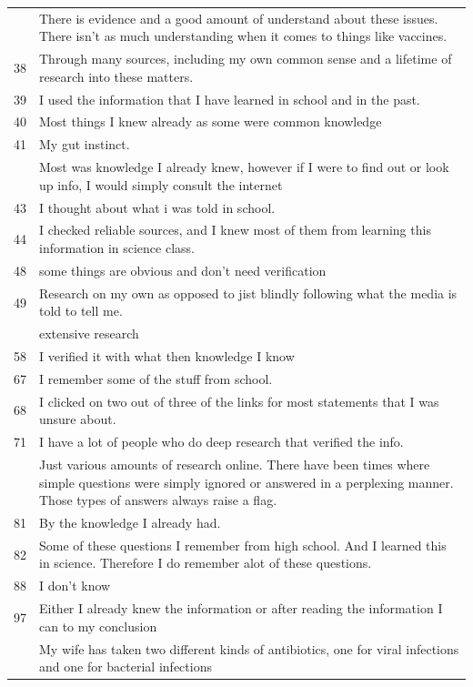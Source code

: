 \documentclass[
  doc,floatsintext]{apa6}
\begin{document}
\begin{longtable}[t]{>{}r>{\raggedright\arraybackslash}p{30em}}
\addlinespace
36 & There is evidence and a good amount of understand about these issues. There isn't as much understanding when it comes to things like vaccines.\\
38 & Through many sources, including my own common sense and a lifetime of research into these matters.\\
39 & I used the information that I have learned in school and in the past.\\
40 & Most things I knew already as some were common knowledge\\
41 & My gut instinct.\\
\addlinespace
42 & Most was knowledge I already knew, however if I were to find out or look up info, I would simply consult the internet\\
43 & I thought about what i was told in school.\\
44 & I checked reliable sources, and I knew most of them from learning this information in science class.\\
48 & some things are obvious and don't need verification\\
49 & Research on my own as opposed to jist blindly following what the media is told to tell me.\\
\addlinespace
56 & extensive research\\
58 & I verified it with what then knowledge I know\\
67 & I remember some of the stuff from school.\\
68 & I clicked on two out of three of the links for most statements that I was unsure about.\\
71 & I have a lot of people who do deep research that verified the info.\\
\addlinespace
77 & Just various amounts of research online. There have been times where simple questions were simply ignored or answered in a perplexing manner. Those types of answers always raise a flag.\\
81 & By  the knowledge I already had.\\
82 & Some of these questions I remember from high school. And I learned this in science. Therefore I do remember alot of these questions.\\
88 & I don't know\\
97 & Either I already knew the information or after reading the information I can to my conclusion\\
\addlinespace
98 & My wife has taken two different kinds of antibiotics, one for viral infections and one for bacterial infections\\

\end{longtable}
\end{document}
